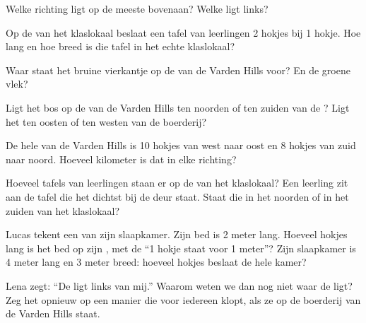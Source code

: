 \begin{exercise}[$\star$]\label{exo:g2:drawing-to-map:4}
Welke richting ligt op de meeste  bovenaan? Welke ligt links?
\end{exercise}

\begin{exercise}[$\star$]\label{exo:g2:drawing-to-map:5}
Op de  van het klaslokaal beslaat een tafel van leerlingen
2 hokjes bij 1 hokje. Hoe lang en hoe breed is die tafel in het echte
klaslokaal?
\end{exercise}

\begin{exercise}[$\star$]\label{exo:g2:drawing-to-map:6}
Waar staat het bruine vierkantje op de  van de Varden Hills voor? En
de groene vlek?
\end{exercise}

\begin{exercise}[$\star\star$]\label{exo:g2:drawing-to-map:7}
Ligt het bos op de  van de Varden Hills ten noorden of ten zuiden van
de ? Ligt het ten oosten of ten westen van de boerderij?
\end{exercise}

\begin{exercise}[$\star\star$]\label{exo:g2:drawing-to-map:8}
De hele  van de Varden Hills is 10 hokjes van west naar oost en
8 hokjes van zuid naar noord. Hoeveel kilometer is dat in elke richting?
\end{exercise}

\begin{exercise}[$\star\star$]\label{exo:g2:drawing-to-map:9}
Hoeveel tafels van leerlingen staan er op de  van het
klaslokaal? Een leerling zit aan de tafel die het dichtst bij de deur
staat. Staat die in het noorden of in het zuiden van het klaslokaal?
\end{exercise}

\begin{exercise}[$\star\star$]\label{exo:g2:drawing-to-map:10}
Lucas tekent een  van zijn slaapkamer. Zijn bed is 2 meter
lang. Hoeveel hokjes lang is het bed op zijn , met de 
``1 hokje staat voor 1 meter''? Zijn slaapkamer is 4 meter lang en 3 meter
breed: hoeveel hokjes beslaat de hele kamer?
\end{exercise}

\begin{exercise}[$\star\star$]\label{exo:g2:drawing-to-map:11}
Lena zegt: ``De  ligt links van mij.'' Waarom weten we dan nog niet
waar de  ligt? Zeg het opnieuw op een manier die voor iedereen klopt,
als ze op de boerderij van de Varden Hills staat.
\end{exercise}
